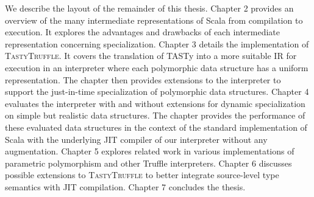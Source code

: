 We describe the layout of the remainder of this thesis.
Chapter 2 provides an overview of the many intermediate representations of Scala from compilation to execution.
It explores the advantages and drawbacks of each intermediate representation concerning specialization.
Chapter 3 details the implementation of \textsc{TastyTruffle}.
It covers the translation of TASTy into a more suitable IR for execution in an interpreter where each polymorphic data structure has a uniform representation.
The chapter then provides extensions to the interpreter to support the just-in-time specialization of polymorphic data structures.
Chapter 4 evaluates the interpreter with and without extensions for dynamic specialization on simple but realistic data structures.
The chapter provides the performance of these evaluated data structures in the context of the standard implementation of Scala with the underlying JIT compiler of our interpreter without any augmentation.
Chapter 5 explores related work in various implementations of parametric polymorphism and other Truffle interpreters.
Chapter 6 discusses possible extensions to \textsc{TastyTruffle} to better integrate source-level type semantics with JIT compilation.
Chapter 7 concludes the thesis.